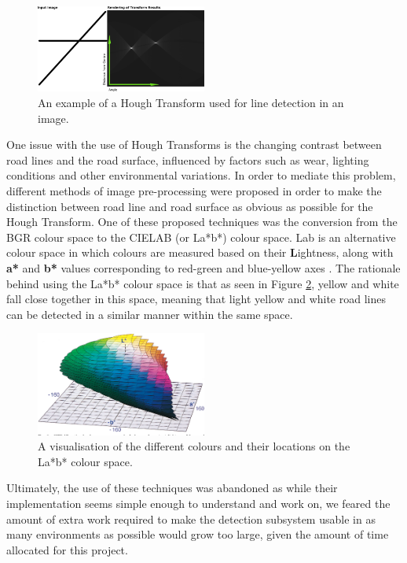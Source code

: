 \documentclass[titlepage,draft]{article}
\begin{document}
\begin{figure}
	\centering
	\includegraphics[width=0.5\textwidth]{Hough-example}
	\caption{An example of a Hough Transform used for line detection in an image.}
	\label{HoughTransform}
\end{figure}

One issue with the use of Hough Transforms is the changing contrast between road lines and the road surface, influenced by
factors such as wear, lighting conditions and other environmental variations.
In order to mediate this problem, different methods of image pre-processing were proposed in order to make the distinction
between road line and road surface as obvious as possible for the Hough Transform.
One of these proposed techniques was the conversion from the BGR colour space to the CIELAB (or La*b*) colour space.
La\*b\* is an alternative colour space in which colours are measured based on their \textbf{L}ightness, along with \textbf{a*} and
\textbf{b*} values corresponding to red-green and blue-yellow axes \cite{Mclaren2008}.
The rationale behind using the La*b* colour space is that as seen in Figure \ref{LabColourSpace}, yellow and white fall close
together in this space, meaning that light yellow and white road lines can be detected in a similar manner within the same space.

\begin{figure}
	\centering
	\includegraphics[width=0.5\textwidth]{Lab-colour-space}
	\caption{A visualisation of the different colours and their locations on the La*b* colour space.}
	\label{LabColourSpace}
\end{figure}

Ultimately, the use of these techniques was abandoned as while their implementation seems simple enough to understand and work
on, we feared the amount of extra work required to make the detection subsystem usable in as many environments as possible
would grow too large, given the amount of time allocated for this project.
\end{document}
